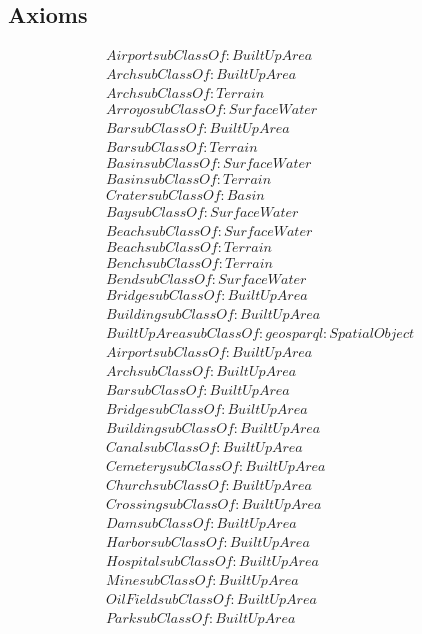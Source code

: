 \subsection{Axioms}
\begin{align}
  Airport subClassOf: BuiltUpArea\\
  Arch subClassOf: BuiltUpArea\\
  Arch subClassOf: Terrain\\
  Arroyo subClassOf: SurfaceWater\\
  Bar subClassOf: BuiltUpArea\\
  Bar subClassOf: Terrain\\
  Basin subClassOf: SurfaceWater\\
  Basin subClassOf: Terrain\\
  Crater subClassOf: Basin\\
  Bay subClassOf: SurfaceWater\\
  Beach subClassOf: SurfaceWater\\
  Beach subClassOf: Terrain\\
  Bench subClassOf: Terrain\\
  Bend subClassOf: SurfaceWater\\
  Bridge subClassOf: BuiltUpArea\\
  Building subClassOf: BuiltUpArea\\
  BuiltUpArea subClassOf: geosparql:SpatialObject\\
  Airport subClassOf: BuiltUpArea\\
  Arch subClassOf: BuiltUpArea\\
  Bar subClassOf: BuiltUpArea\\
  Bridge subClassOf: BuiltUpArea\\
  Building subClassOf: BuiltUpArea\\
  Canal subClassOf: BuiltUpArea\\
  Cemetery subClassOf: BuiltUpArea\\
  Church subClassOf: BuiltUpArea\\
  Crossing subClassOf: BuiltUpArea\\
  Dam subClassOf: BuiltUpArea\\
  Harbor subClassOf: BuiltUpArea\\
  Hospital subClassOf: BuiltUpArea\\
  Mine subClassOf: BuiltUpArea\\
  OilField subClassOf: BuiltUpArea\\
  Park subClassOf: BuiltUpArea\\

\end{align}
